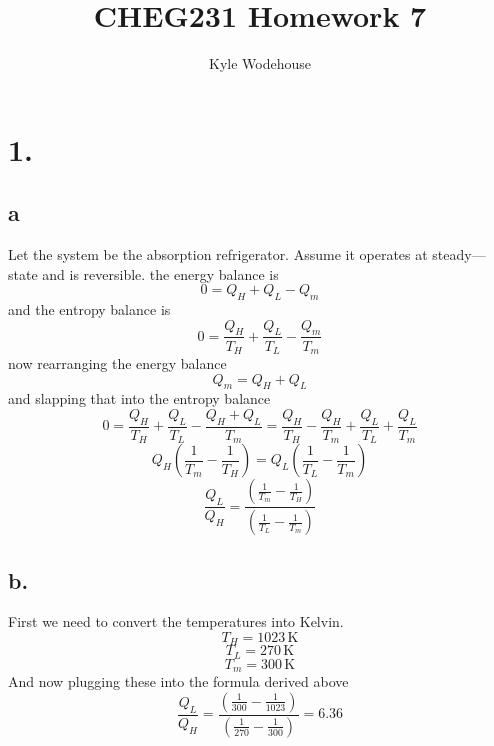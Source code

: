 \documentclass{article}
\title{\bfseries CHEG231 Homework 7}
\author{Kyle Wodehouse}
\date{}
\begin{document}
\maketitle
\section*{1.}
\begin{center}
\end{center}
\subsection*{a}
Let the system be the absorption refrigerator. Assume it operates at steady---state and is reversible. the energy balance is
\[ 0 = Q_H + Q_L - Q_m \]
and the entropy balance is
\[ 0 = \frac{Q_H}{T_H} + \frac{Q_L}{T_L} - \frac{Q_m}{T_m} \]
now rearranging the energy balance
\[ Q_m = Q_H + Q_L   \]
and slapping that into the entropy balance
\[ 0 = \frac{Q_H}{T_H} + \frac{Q_L}{T_L} - \frac{Q_H + Q_L}{T_m} = \frac{Q_H}{T_H} - \frac{Q_H}{T_m} + \frac{Q_L}{T_L} + \frac{Q_L}{T_m} \]
\[ Q_H \left( \frac{1}{T_m} - \frac{1}{T_H} \right) = Q_L \left( \frac{1}{T_L} - \frac{1}{T_m} \right) \]
\[ \boxed{\frac{Q_L}{Q_H}  = \frac{\displaystyle \left( \frac{1}{T_m} - \frac{1}{T_H} \right)}{\displaystyle \left( \frac{1}{T_L} - \frac{1}{T_m} \right)}} \]
\subsection*{b.}
First we need to convert the temperatures into Kelvin.
\[ T_H = 1023\,\text{K} \]
\[ T_L = 270\,\text{K} \]
\[ T_m = 300\,\text{K} \]
And now plugging these into the formula derived above
\[ \frac{Q_L}{Q_H}  = \frac{\displaystyle \left( \frac{1}{300} - \frac{1}{1023} \right)}{\displaystyle \left( \frac{1}{270} - \frac{1}{300} \right)} = \boxed{6.36} \]
\end{document}
